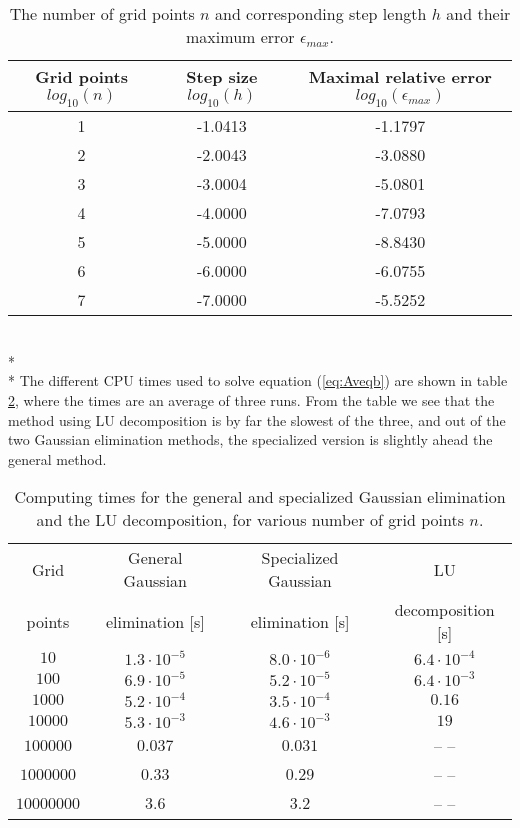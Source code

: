\documentclass[norsk,a4paper,12pt]{article}
\begin{document}
\begin{table}[h!]
\begin{center}
\caption{The number of grid points $n$ and corresponding step length $h$ and their maximum error $\epsilon_{max}$.}
\label{tab:error}
\begin{tabular}{|c|c|c|} \hline
Grid points $log_{10}(n)$ & Step size $log_{10}(h)$ & Maximal relative error $log_{10}(\epsilon_{max})$ \\ \hline
1&-1.0413&-1.1797 \\
2&-2.0043&-3.0880 \\
3&-3.0004&-5.0801 \\
4&-4.0000&-7.0793 \\
5&-5.0000&-8.8430 \\
6&-6.0000&-6.0755 \\
7&-7.0000&-5.5252 \\ \hline
\end{tabular}
\end{center}
\end{table}
\\* \\* \noindent
The different CPU times used to solve equation (\ref{eq:Aveqb}) are shown in table \ref{tab:cputimes}, where the times are an average of three runs. From the table we see that the method using LU decomposition is by far the slowest of the three, and out of the two Gaussian elimination methods, the specialized version is slightly ahead the general method.
\begin{table}[h!]
\begin{center}
\caption{Computing times for the general and specialized Gaussian elimination and the LU decomposition, for various number of grid points $n$.}
\label{tab:cputimes}
\begin{tabular}{|c|c|c|c|} \hline
Grid & General Gaussian & Specialized Gaussian & LU \\
points & elimination [s] & elimination [s] & decomposition [s] \\ \hline
$10$ & $1.3\cdot 10^{-5}$ & $8.0\cdot 10^{-6}$ & $6.4\cdot 10^{-4}$ \\
$100$ & $6.9\cdot 10^{-5}$ & $5.2\cdot 10^{-5}$ & $6.4\cdot 10^{-3}$ \\
$1000$ & $5.2\cdot 10^{-4}$ & $3.5\cdot 10^{-4}$ & $0.16$ \\
$10000$ & $5.3\cdot 10^{-3}$ & $4.6\cdot 10^{-3}$ & $19$ \\
$100000$ & $0.037$ & $0.031$ & -- -- \\
$1000000$ & $0.33$ & $0.29$ & -- -- \\
$10000000$ & $3.6$ & $3.2$ & -- -- \\ \hline
\end{tabular}
\end{center}
\end{table}
\end{document}
